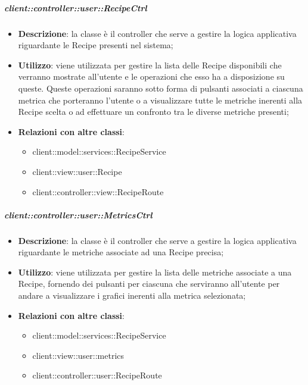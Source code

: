 		\subparagraph{client::controller::user::RecipeCtrl} %
		\label{subp:client_controller_user_recipectrl}
			\begin{itemize}
				\item \textbf{Descrizione}: la classe è il controller che serve a gestire la logica applicativa riguardante le Recipe presenti nel sistema;
				\item \textbf{Utilizzo}: viene utilizzata per gestire la lista delle Recipe disponibili che verranno mostrate all'utente e le operazioni che esso ha a disposizione su queste. Queste operazioni saranno sotto forma di pulsanti associati a ciascuna metrica che porteranno l'utente o a visualizzare tutte le metriche inerenti alla Recipe scelta o ad effettuare un confronto tra le diverse metriche presenti;
				\item \textbf{Relazioni con altre classi}:
					\begin{itemize}
						\item client::model::services::RecipeService
						\item client::view::user::Recipe
						\item client::controller::view::RecipeRoute
					\end{itemize}
			\end{itemize}

		\subparagraph{client::controller::user::MetricsCtrl} %
		\label{subp:client_controller_user_metricsctrl}
			\begin{itemize}
				\item \textbf{Descrizione}: la classe è il controller che serve a gestire la logica applicativa riguardante le metriche associate ad una Recipe precisa;
				\item \textbf{Utilizzo}: viene utilizzata per gestire la lista delle metriche associate a una Recipe, fornendo dei pulsanti per ciascuna che serviranno all'utente per andare a visualizzare i grafici inerenti alla metrica selezionata;
				\item \textbf{Relazioni con altre classi}:
					\begin{itemize}
						\item client::model::services::RecipeService
						\item client::view::user::metrics
						\item client::controller::user::RecipeRoute
					\end{itemize}
			\end{itemize}

